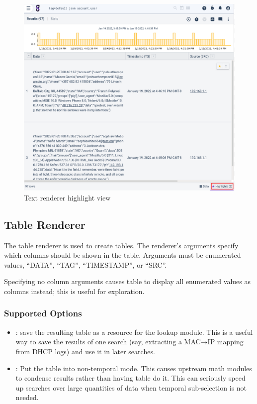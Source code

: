 \begin{figure}
	\includegraphics[width=0.7\linewidth]{images/text-highlights.png}
	\caption{Text renderer highlight view}
	\label{fig:text-highlights}
\end{figure}



\subsection{Table Renderer}

The table renderer is used to create tables. The renderer's arguments
specify which columns should be shown in the table. Arguments must be
enumerated values, ``DATA'', ``TAG'', ``TIMESTAMP'', or ``SRC''.

Specifying no column arguments causes table to display all enumerated
values as columns instead; this is useful for exploration.

\subsubsection{Supported Options}

\begin{itemize}
\item
  : save the resulting table
  as a resource for the lookup module. This is a useful way to save the
  results of one search (say, extracting a MAC→IP mapping
  from DHCP logs) and use it in later searches.
\item
  : Put the table into non-temporal mode. This causes upstream math
  modules to condense results rather than having table do it. This can
  seriously speed up searches over large quantities of data when
  temporal sub-selection is not needed.
\end{itemize}

